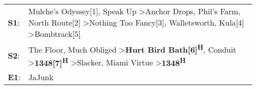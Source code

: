 \begin{supertabular}{p{0.03\textwidth}p{0.92\textwidth}}
 \textbf{S1}:  &  Mulche's Odyssey[1]\textsuperscript{}, \enspace Speak Up\textsuperscript{} \textgreater \enspace Anchor Drops\textsuperscript{}, \enspace Phil's Farm\textsuperscript{}, \enspace North Route[2]\textsuperscript{} \textgreater \enspace Nothing Too Fancy[3]\textsuperscript{}, \enspace Walletsworth\textsuperscript{}, \enspace Kula[4]\textsuperscript{} \textgreater \enspace Bombtrack[5]\textsuperscript{}  \enspace  \\
 \textbf{S2}:  &                             The Floor\textsuperscript{}, \enspace Much Obliged\textsuperscript{} \textgreater \enspace \textbf{Hurt Bird Bath[6]\textsuperscript{H}}, \enspace Conduit\textsuperscript{} \textgreater \enspace \textbf{1348[7]\textsuperscript{H}} \textgreater \enspace Slacker\textsuperscript{}, \enspace Miami Virtue\textsuperscript{} \textgreater \enspace \textbf{1348\textsuperscript{H}}  \enspace  \\
 \textbf{E1}:  &                                                                                                                                                                                                                                                                                                                                                                                           JaJunk\textsuperscript{}  \enspace  \\
\end{supertabular}
